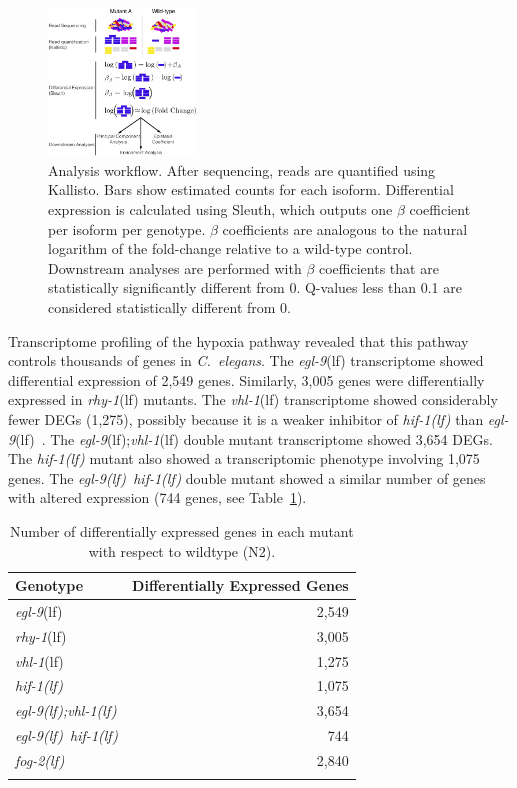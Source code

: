 \documentclass[9pt,twocolumn,twoside,lineno]{pnas-new}
\newcommand{\cel}{\emph{C.~elegans}}
\newcommand{\gene}[1]{\mbox{\emph{#1}}}
\newcommand{\fog}{\gene{fog-2(lf)}}
\newcommand{\egl}{\gene{egl-9}(lf)}
\newcommand{\rhy}{\gene{rhy-1}(lf)}
\newcommand{\vhl}{\gene{vhl-1}(lf)}
\newcommand{\eglvhl}{\gene{egl-9(lf);vhl-1(lf)}}
\newcommand{\eglhif}{\gene{egl-9(lf) hif-1(lf)}}
\newcommand{\hif}{\gene{hif-1(lf)}}
\newcommand{\egln}{2,549}
\newcommand{\rhyn}{3,005}
\newcommand{\vhln}{1,275}
\newcommand{\eglvhln}{3,654}
\newcommand{\hifn}{1,075}
\newcommand{\eglhifn}{744}
\newcommand{\fogn}{2,840}
\begin{document}
\begin{figure}[tbhp]
  \centering
  \includegraphics[width=0.35\textwidth]{../figs/meaningofbeta.pdf}
  \caption{
    Analysis workflow. After sequencing, reads are quantified using Kallisto.
    Bars show estimated counts for each isoform. Differential expression is
    calculated using Sleuth, which outputs one $\beta$ coefficient per isoform
    per genotype. $\beta$ coefficients are analogous to the natural logarithm of
    the fold-change relative to a wild-type control. Downstream analyses are
    performed with $\beta$ coefficients that are statistically significantly
    different from 0. Q-values less than 0.1 are considered statistically
    different from 0.
  }
\label{fig:explain}
\end{figure}

Transcriptome profiling of the hypoxia pathway revealed that this pathway
controls thousands of genes in \cel{}. The \egl{} transcriptome showed
differential expression of \egln{} genes. Similarly, \rhyn{} genes were
differentially expressed in \rhy{} mutants. The \vhl{} transcriptome showed
considerably fewer DEGs (\vhln{}), possibly because it
is a weaker inhibitor of \hif{} than \egl{}~\cite{Shao2009}. The \egl{};\vhl{}
double mutant transcriptome showed \eglvhln{} DEGs.
The \hif{} mutant also showed a transcriptomic phenotype involving \hifn{}
genes. The \eglhif{} double mutant showed a similar number of genes with altered
expression (\eglhifn{} genes, see Table~\ref{tab:genes}).


\begin{table}[tbhp]
  \centering
  \begin{tabular}{lr}
    \toprule{}
    Genotype & Differentially Expressed Genes\\
    \midrule{}\egl{} & \egln{}\\
    \rhy{} & \rhyn{}\\
    \vhl{} & \vhln{}\\
    \hif{} & \hifn{}\\
    \eglvhl{} & \eglvhln{}\\
    \eglhif{} & \eglhifn{}\\
    \fog{} & \fogn{}\\
    \bottomrule{}
  \end{tabular}
  \caption{Number of differentially expressed genes in each mutant with respect
  to wildtype (N2).}
\label{tab:genes}
\end{table}
\end{document}
